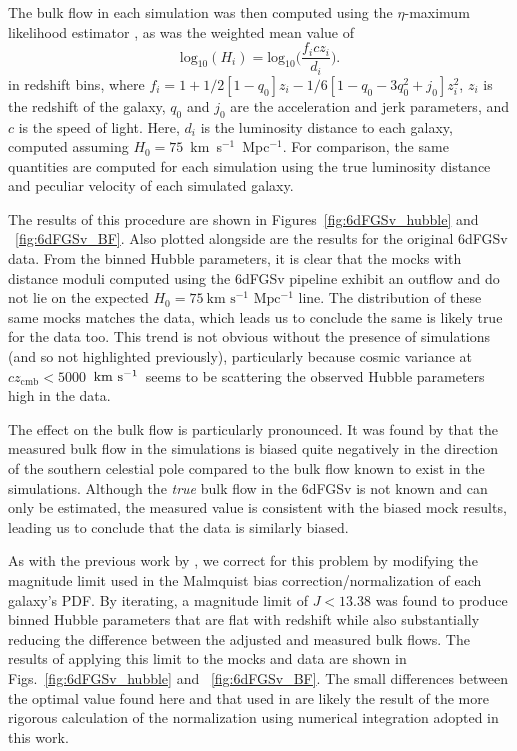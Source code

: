 \documentclass[twocolumn]{aastex63}
\newcommand{\kms}{\mbox{${\rm km~s^{-1}}$}}
\newcommand{\kmsMpc}{\mbox{km s$^{-1}$ Mpc$^{-1}$}}
\begin{document}
The bulk flow in each simulation was then computed using the $\eta$-maximum likelihood estimator \citep{Kaiser1988,Qin2018}, as was the weighted mean value of 
\begin{equation}
    \mathrm{log_{10}}(H_{i}) = \mathrm{log_{10}}\biggl(\frac{f_icz_i}{d_{i}}\biggl).
    \label{eq:logh}
\end{equation}
in redshift bins, where $f_i = 1+1/2[1-q_{0}]z_{i}-1/6[1-q_{0}-3q^{2}_{0}+j_{0}]z_{i}^{2}$, $z_{i}$ is the redshift of the galaxy, $q_{0}$ and $j_{0}$ are the acceleration and jerk parameters, and $c$ is the speed of light. Here, $d_{i}$ is the luminosity distance to each galaxy, computed assuming $H_{0} = 75$~\kmsMpc. For comparison, the same quantities are computed for each simulation using the true luminosity distance and peculiar velocity of each simulated galaxy.

The results of this procedure are shown in Figures~\ref{fig:6dFGSv_hubble} and ~\ref{fig:6dFGSv_BF}. Also plotted alongside are the results for the original 6dFGSv data. From the binned Hubble parameters, it is clear that the mocks with distance moduli computed using the 6dFGSv pipeline exhibit an outflow and do not lie on the expected $H_{0} = 75 ~\kmsMpc$ line. The distribution of these same mocks matches the data, which leads us to conclude the same is likely true for the data too. This trend is not obvious without the presence of simulations (and so not highlighted previously), particularly because cosmic variance at $cz_{\mathrm{cmb}}<5000$~\kms\ seems to be scattering the observed Hubble parameters high in the data. 

The effect on the bulk flow is particularly pronounced. It was found by \cite{Qin2018} that the measured bulk flow in the simulations is biased quite negatively in the direction of the southern celestial pole compared to the bulk flow known to exist in the simulations. Although the {\it true} bulk flow in the 6dFGSv is not known and can only be estimated, the measured value is consistent with the biased mock results, leading us to conclude that the data is similarly biased.


As with the previous work by \cite{Qin2018}, we correct for this problem by modifying the magnitude limit used in the Malmquist bias correction/normalization of each galaxy's PDF. By iterating, a magnitude limit of $J<13.38$ was found to produce binned Hubble parameters that are flat with redshift while also substantially reducing the difference between the adjusted and measured bulk flows. The results of applying this limit to the mocks and data are shown in Figs.~\ref{fig:6dFGSv_hubble} and ~\ref{fig:6dFGSv_BF}. The small differences between the optimal value found here and that used in \cite{Qin2018} are likely the result of the more rigorous calculation of the normalization using numerical integration adopted in this work.
\end{document}

